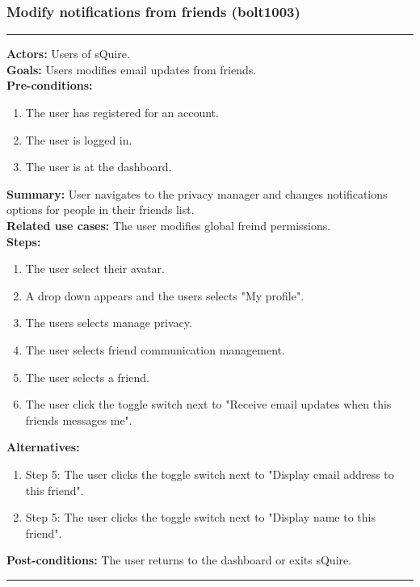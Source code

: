 \documentclass[11pt]{report}
\begin{document}
\subsubsection{Modify notifications from friends (bolt1003)}
\vspace{2pt}
\hrule
\vspace{8pt}
 \textbf{Actors:} Users of sQuire. \\ 
 \textbf{Goals:} Users modifies email updates from friends. \\
 \textbf{Pre-conditions:} \begin{enumerate}
  \item The user has registered for an account.
  \item The user is logged in.
  \item The user is at the dashboard.
 \end{enumerate}
 \textbf{Summary:} User navigates to the privacy manager and changes notifications options for people in their friends list.\\ 
 \textbf{Related use cases:} The user modifies global freind permissions. \\ 
 \textbf{Steps:} \begin{enumerate}
  \item The user select their avatar.
  \item A drop down appears and the users selects "My profile".
  \item The users selects manage privacy.
  \item The user selects friend communication management.
  \item The user selects a friend.
  \item The user click the toggle switch next to "Receive email updates when this friends messages me".
 \end{enumerate}
 \textbf{Alternatives:} \begin{enumerate} 
  \item Step 5: The user clicks the toggle switch next to "Display email address to this friend".
  \item Step 5: The user clicks the toggle switch next to "Display name to this friend".
 \end{enumerate}
 \textbf{Post-conditions:} The user returns to the dashboard or exits sQuire. \\
 \vspace{8pt}
\hrule
\newpage
\end{document}
